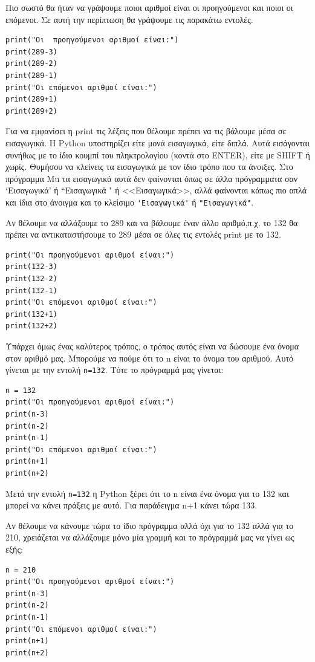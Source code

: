 Πιο σωστό θα ήταν να γράψουμε ποιοι αριθμοί είναι οι προηγούμενοι και ποιοι οι επόμενοι. Σε αυτή την περίπτωση θα γράψουμε τις παρακάτω εντολές.
\begin{lstlisting}
print("Οι  προηγούμενοι αριθμοί είναι:")
print(289-3)
print(289-2)
print(289-1)
print("Οι επόμενοι αριθμοί είναι:")
print(289+1)
print(289+2)
\end{lstlisting}

Για να εμφανίσει η print τις λέξεις που θέλουμε πρέπει να τις βάλουμε μέσα σε εισαγωγικά. Η Python υποστηρίζει είτε μονά εισαγωγικά, είτε διπλά. Αυτά εισάγονται συνήθως με το ίδιο κουμπί του πληκτρολογίου (κοντά στο ENTER), είτε με SHIFT ή χωρίς. Θυμήσου να κλείνεις τα εισαγωγικά με τον ίδιο τρόπο που τα άνοιξες. Στο πρόγραμμα Mu τα εισαγωγικά αυτά δεν φαίνονται όπως σε άλλα πρόγραμματα σαν `Εισαγωγικά' ή ``Εισαγωγικά " ή <<Εισαγωγικά>>, αλλά φαίνονται κάπως πιο απλά και ίδια στο άνοιγμα και το κλείσιμο \lstinline{'Εισαγωγικά'} ή  \lstinline{"Εισαγωγικά"}. 

Αν θέλουμε να αλλάξουμε το 289 και να βάλουμε έναν άλλο αριθμό,π.χ. το 132 θα πρέπει να αντικαταστήσουμε το 289 μέσα σε όλες τις εντολές print με το 132.
\begin{lstlisting}
print("Οι προηγούμενοι αριθμοί είναι:")
print(132-3)
print(132-2)
print(132-1)
print("Οι επόμενοι αριθμοί είναι:")
print(132+1)
print(132+2)
\end{lstlisting}

Υπάρχει όμως ένας καλύτερος τρόπος, ο τρόπος αυτός είναι να δώσουμε ένα όνομα στον αριθμό μας. Μπορούμε να πούμε ότι το n είναι το όνομα του αριθμού. Αυτό γίνεται με την εντολή \lstinline{n=132}. Τότε το πρόγραμμά μας γίνεται:
\begin{lstlisting}
n = 132
print("Οι προηγούμενοι αριθμοί είναι:")
print(n-3)
print(n-2)
print(n-1)
print("Οι επόμενοι αριθμοί είναι:")
print(n+1)
print(n+2)
\end{lstlisting}

Μετά την εντολή \lstinline{n=132} η Python ξέρει ότι το n είναι ένα όνομα για το 132 και μπορεί να κάνει πράξεις με αυτό. Για παράδειγμα n+1 κάνει τώρα 133.

Αν θέλουμε να κάνουμε τώρα το ίδιο πρόγραμμα αλλά όχι για το 132 αλλά για το 210, χρειάζεται να αλλάξουμε μόνο μία γραμμή και το πρόγραμμά μας να γίνει ως εξής:
\begin{lstlisting}
n = 210
print("Οι προηγούμενοι αριθμοί είναι:")
print(n-3)
print(n-2)
print(n-1)
print("Οι επόμενοι αριθμοί είναι:")
print(n+1)
print(n+2)
\end{lstlisting}

